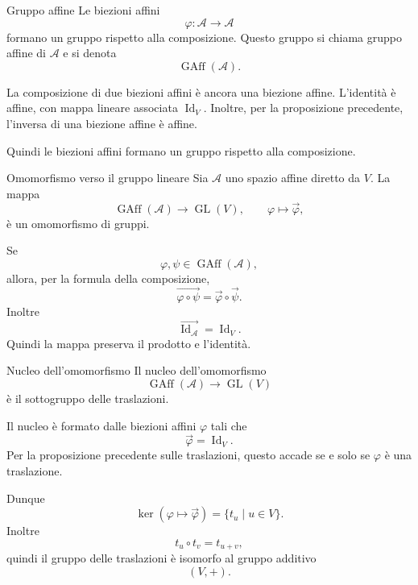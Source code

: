 \documentclass[a4paper]{article}
\begin{document}
\begin{snippetcorollary}{Gruppo affine}
    Le biezioni affini
    \[
        \varphi:\mathcal{A}\to\mathcal{A}
    \]
    formano un gruppo rispetto alla composizione. Questo gruppo si chiama gruppo affine di \(\mathcal{A}\) e si denota
    \[
        \operatorname{GAff}(\mathcal{A}).
    \]
\end{snippetcorollary}

\begin{snippetproof}{}
    La composizione di due biezioni affini è ancora una biezione affine. L'identità è affine, con mappa lineare associata \(\operatorname{Id}_V\). Inoltre, per la proposizione precedente, l'inversa di una biezione affine è affine.

    Quindi le biezioni affini formano un gruppo rispetto alla composizione.
\end{snippetproof}

\begin{snippetproposition}{Omomorfismo verso il gruppo lineare}
    Sia \(\mathcal{A}\) uno spazio affine diretto da \(V\). La mappa
    \[
        \operatorname{GAff}(\mathcal{A})\to\operatorname{GL}(V),
        \qquad
        \varphi\mapsto\overrightarrow{\varphi},
    \]
    è un omomorfismo di gruppi.
\end{snippetproposition}

\begin{snippetproof}{}
    Se
    \[
        \varphi,\psi\in\operatorname{GAff}(\mathcal{A}),
    \]
    allora, per la formula della composizione,
    \[
        \overrightarrow{\varphi\circ\psi}
        =
        \overrightarrow{\varphi}\circ\overrightarrow{\psi}.
    \]
    Inoltre
    \[
        \overrightarrow{\operatorname{Id}_{\mathcal{A}}}
        =
        \operatorname{Id}_V.
    \]
    Quindi la mappa preserva il prodotto e l'identità.
\end{snippetproof}

\begin{snippetproposition}{Nucleo dell'omomorfismo}
    Il nucleo dell'omomorfismo
    \[
        \operatorname{GAff}(\mathcal{A})\to\operatorname{GL}(V)
    \]
    è il sottogruppo delle traslazioni.
\end{snippetproposition}

\begin{snippetproof}{}
    Il nucleo è formato dalle biezioni affini \(\varphi\) tali che
    \[
        \overrightarrow{\varphi}=\operatorname{Id}_V.
    \]
    Per la proposizione precedente sulle traslazioni, questo accade se e solo se \(\varphi\) è una traslazione.

    Dunque
    \[
        \ker(\varphi\mapsto\overrightarrow{\varphi})
        =
        \{t_u\mid u\in V\}.
    \]
    Inoltre
    \[
        t_u\circ t_v=t_{u+v},
    \]
    quindi il gruppo delle traslazioni è isomorfo al gruppo additivo
    \[
        (V,+).
    \]
\end{snippetproof}
\end{document}
